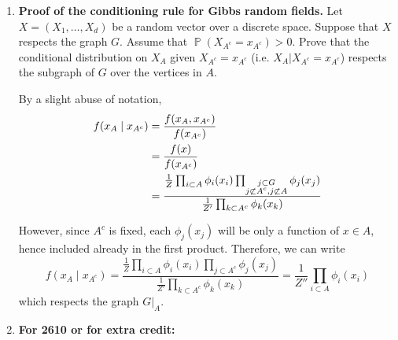 \documentclass[11pt]{report}
\DeclareMathOperator{\Prob}{\mathbb{P}}
\newcommand{\sub}{\subset}
\begin{document}
\begin{enumerate}[1.]

	      \pagebreak

	\item {\bf Proof of the conditioning rule for Gibbs random fields.} Let $X=(X_1,\dotsc,X_d)$ be a random vector over a discrete space.  Suppose that $X$ respects the graph $G$.
	      Assume that $\Prob(X_{A^c}=x_{A^c})>0$.
	      Prove that the conditional distribution on $X_A$ given $X_{A^c}=x_{A^c}$ (i.e. $X_A|X_{A^c}=x_{A^c}$) respects the subgraph of $G$ over the vertices in $A$.

	      \color{blue}
	      By a slight abuse of notation,
	      \begin{align*}
		      f(x_A \; | \; x_{A^c}) & = \frac{f(x_A,x_{A^c})}{f(x_{A^c})}                                                                                                \\
		                             & = \frac{f(x)}{f(x_{A^c})}                                                                                                          \\
		                             & = \frac{\frac{1}{Z} \prod_{i \sub A} \phi_i(x_i) \prod_{\begin{subarray}{c}
					                                                                                       j \sub G\\
					                                                                                       j \not\sub A^c, j \not\sub A
				                                                                                       \end{subarray}} \phi_j(x_j)}{\frac{1}{Z'} \prod_{k \sub A^c} \phi_k(x_k) } \\
	      \end{align*}

	      However, since $A^c$ is fixed, each $\phi_j(x_j)$ will be only a function of $x \in A$, hence included already in the first product. Therefore, we can write
	      \[f(x_A \; | \; x_{A^c}) = \frac{\frac{1}{Z} \prod_{i \sub A} \phi_i(x_i) \prod_{j \sub A^c} \phi_j(x_j)}{\frac{1}{Z'} \prod_{k \sub A^c} \phi_k(x_k) } = \frac{1}{Z''} \prod_{i \sub A} \phi_i(x_i)\]
	      which respects the graph $G \vert_A$.
	      \color{black}


	      \pagebreak



	\item[] \hspace{-3ex} {\bf For 2610 or for extra credit:}






\end{enumerate}
\end{document}
